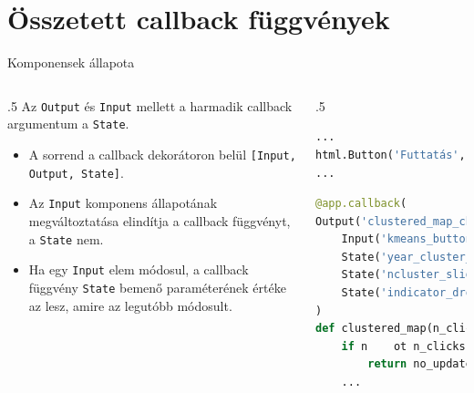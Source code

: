 \documentclass[english, aspectratio=169]{beamer}
\makeatletter
\let\origtableofcontents=\tableofcontents
\def\tableofcontents{\@ifnextchar[{\origtableofcontents}{\gobbletableofcontents}}
\def\gobbletableofcontents#1{\origtableofcontents}
\makeatother
\begin{document}
\section{Összetett callback függvények}

\begin{frame}{}
	\tableofcontents[currentsection]
\end{frame}

\begin{frame}[fragile]{Komponensek állapota}
	\begin{columns}
		\begin{column}{.5\textwidth}
			Az \texttt{Output} és \texttt{Input} mellett a harmadik callback argumentum a \texttt{State}. 
			\begin{itemize}
				\item A sorrend a callback dekorátoron belül \texttt{[Input, Output, State]}.
				\item Az \texttt{Input} komponens állapotának megváltoztatása elindítja a callback függvényt, a \texttt{State} nem. 
				\item Ha egy \texttt{Input} elem módosul, a callback függvény \texttt{State} bemenő paraméterének értéke az lesz, amire az legutóbb módosult. 
			\end{itemize}
		\end{column}
		\begin{column}{.5\textwidth}
			\begin{lstlisting}[language=python]
...
html.Button('Futtatás', id='kmeans_button')
...
			\end{lstlisting}
			\begin{lstlisting}[language=python]
@app.callback(
Output('clustered_map_chart', 'figure'),
	Input('kmeans_button', 'n_clicks'),
	State('year_cluster_slider', 'value'),
	State('ncluster_slider', 'value'),
	State('indicator_dropdown', 'value'),
)
def clustered_map(n_clicks, year, n_clusters, indicator):
	if n	ot n_clicks:
		return no_update
	...
			\end{lstlisting}
		\end{column}
	\end{columns}	
\end{frame}
\end{document}
